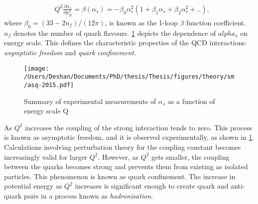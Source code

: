 \begin{equation}
    \label{eq:rge}
    \begin{aligned}
        & Q^2 \frac{\partial\alpha_s}{\partial\mu_R^2} = \beta(\alpha_s) = -\beta_0\alpha_s^2(1+\beta_1\alpha_s + \beta_2\alpha_s^2+ ..),
     \end{aligned}
\end{equation}
where $\beta_0 = (33-2n_f)/(12\pi)$, is known as the 1-loop $\beta$ function coefficient. $n_f$ denotes the number of quark flavours. \cref{fig:alphasrun} depicts the dependence of $alpha_s$ on energy scale. This defines the characteristic properties of the QCD interactions: \emph{asymptotic freedom} and \emph{quark confinement}. 
\begin{figure}[!htpb]
    \centering
    \texttt{[image: /Users/Deshan/Documents/PhD/thesis/Thesis/figures/theory/sm/asq-2015.pdf]}
    \caption{Summary of experimental measurements of $\alpha_s$ as a function of energy scale Q~\cite{PDG}}
    \label{fig:alphasrun}
\end{figure}
As $Q^2$ increases the coupling of the strong interaction tends to zero. This process is known as asymptotic freedom, and it is observed experimentally, as shown in \cref{fig:alphasrun}. Calculations involving perturbation theory for the coupling constant becomes increasingly valid for larger $Q^2$. However, as $Q^2$ gets smaller, the coupling between the quarks becomes strong and prevents them from existing as isolated particles. This phenomenon is known as quark confinement. The increase in potential energy as $Q^2$ increases is significant enough to create quark and anti-quark pairs in a process known as \emph{hadronisation}.


